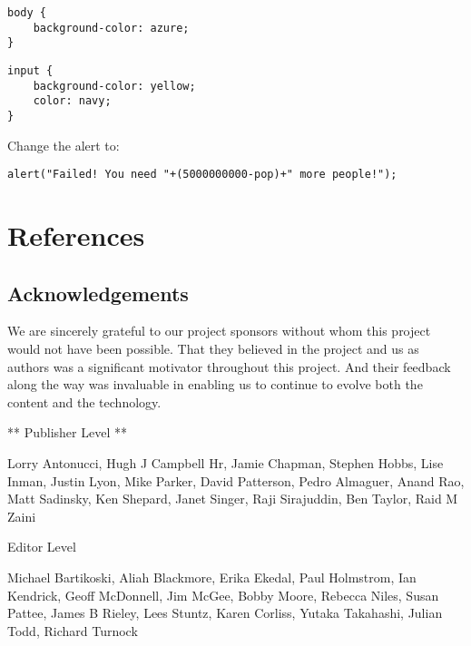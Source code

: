 \documentclass[]{memoir}
\begin{document}
\begin{lstlisting}
body {
    background-color: azure;
}
\end{lstlisting}


\begin{lstlisting}
input {
    background-color: yellow;
    color: navy;
}
\end{lstlisting}


Change the alert to:

\begin{lstlisting}
alert("Failed! You need "+(5000000000-pop)+" more people!");
\end{lstlisting}

\chapter{References}

\section{Acknowledgements}

We are sincerely grateful to our project sponsors without whom this
project would not have been possible. That they believed in the project
and us as authors was a significant motivator throughout this project.
And their feedback along the way was invaluable in enabling us to
continue to evolve both the content and the technology.

** Publisher Level **

Lorry Antonucci, Hugh J Campbell Hr, Jamie Chapman, Stephen Hobbs, Lise
Inman, Justin Lyon, Mike Parker, David Patterson, Pedro Almaguer, Anand
Rao, Matt Sadinsky, Ken Shepard, Janet Singer, Raji Sirajuddin, Ben
Taylor, Raid M Zaini

Editor Level

Michael Bartikoski, Aliah Blackmore, Erika Ekedal, Paul Holmstrom, Ian
Kendrick, Geoff McDonnell, Jim McGee, Bobby Moore, Rebecca Niles, Susan
Pattee, James B Rieley, Lees Stuntz, Karen Corliss, Yutaka Takahashi,
Julian Todd, Richard Turnock
\end{document}
